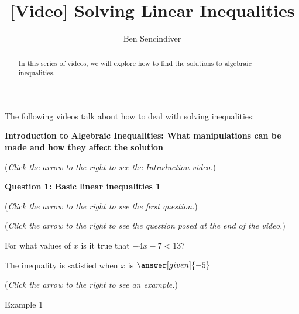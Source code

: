 \documentclass{ximera}
\title[Prerequisite Videos: ]{[Video] Solving Linear Inequalities}
\author{Ben Sencindiver}
\begin{document}
\begin{abstract}
  In this series of videos, we will explore how to find the solutions
  to algebraic inequalities. 
\end{abstract}
\maketitle

The following videos talk about how to deal with solving inequalities:


\textbf{Introduction to Algebraic Inequalities: What manipulations
can
be made and how they affect the solution}
\begin{flushright}
{\color{blue}(\emph{Click the arrow to the right to see the Introduction video.})}
\end{flushright}
\begin{center}
\begin{expandable}
\end{expandable}
\end{center}





\textbf{Question 1: Basic linear inequalities 1}
\begin{question}
\begin{flushright}
{\color{blue}(\emph{Click the arrow to the right to see the first question.})}
\end{flushright}
\begin{center}
\begin{expandable}
{\color{blue}(\emph{Click the arrow to the right to see the question
posed at the end of the video.})}
\begin{expandable}
For what values of $x$ is it true that $-4x-7 <13$?\\
\begin{prompt}
The inequality is satisfied when $x$ is  $\answer[given]{-5}$\\


\end{prompt}
\begin{flushright}
{\color{blue}(\emph{Click the arrow to the right to see an example.})}
\end{flushright}
\begin{expandable}
Example 1
\end{expandable}
\end{expandable}
\end{expandable}
\end{center}
\end{question}
\end{document}
